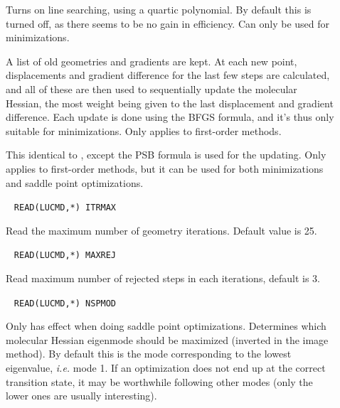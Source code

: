 \begin{description}
\item[]
Turns on line searching,
using a quartic polynomial. By default this
is turned off, as there seems to be no gain in efficiency. Can only be
used for minimizations.

\item[]
A list of old geometries and gradients are kept. At each new point,
displacements and gradient difference for the last few steps are
calculated, and all of these are then used to sequentially update the
molecular Hessian, the most weight being given to the last displacement and
gradient difference. Each update is done using the BFGS formula, and
it's thus only suitable for minimizations. Only applies to first-order
methods.

\item[]
This identical to , except the PSB formula is used for the
updating. Only applies to first-order methods, but it can be used for both minimizations and saddle
point optimizations.

\item[]\verb| |
\newline
\verb|READ(LUCMD,*) ITRMAX|

Read the maximum number of geometry iterations.
Default value is 25.

\item[]\verb| |
\newline
\verb|READ(LUCMD,*) MAXREJ|

Read maximum number of rejected steps
in each iterations, default is 3.

\item[]\verb| |
\newline
\verb|READ(LUCMD,*) NSPMOD|

Only has effect when doing saddle point optimizations.
Determines which molecular Hessian eigenmode should be maximized (inverted in the image
method). By default this is the mode corresponding to the lowest
eigenvalue, {\it i.e.\/} mode 1. If an optimization does not end up at
the correct transition state, it may be worthwhile following other modes
(only the lower ones are usually interesting).


\end{description}
